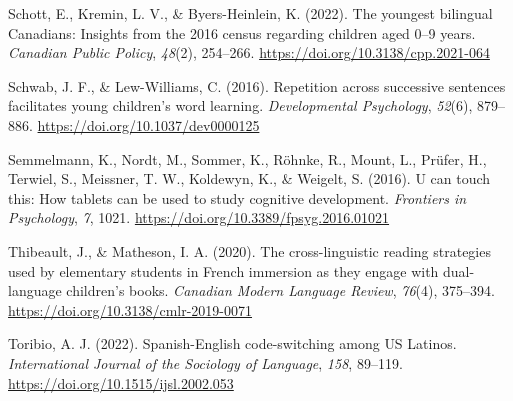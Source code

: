 \documentclass[
  man,floatsintext]{apa7}
\newlength{\cslhangindent}
\newlength{\cslentryspacingunit} %
\newenvironment{CSLReferences}[2] %
 {%
  \setlength{\parindent}{0pt}
  \ifodd #1
  \let\oldpar\par
  \def\par{\hangindent=\cslhangindent\oldpar}
  \fi
  \setlength{\parskip}{#2\cslentryspacingunit}
 }%
 {}
\begin{document}
\begin{CSLReferences}{1}{0}
\leavevmode{}%
Schott, E., Kremin, L. V., \& Byers-Heinlein, K. (2022). The youngest bilingual {Canadians}: Insights from the 2016 census regarding children aged 0--9 years. \emph{Canadian Public Policy}, \emph{48}(2), 254--266. \url{https://doi.org/10.3138/cpp.2021-064}

\leavevmode{}%
Schwab, J. F., \& Lew-Williams, C. (2016). Repetition across successive sentences facilitates young children's word learning. \emph{Developmental Psychology}, \emph{52}(6), 879--886. \url{https://doi.org/10.1037/dev0000125}

\leavevmode{}%
Semmelmann, K., Nordt, M., Sommer, K., Röhnke, R., Mount, L., Prüfer, H., Terwiel, S., Meissner, T. W., Koldewyn, K., \& Weigelt, S. (2016). U can touch this: How tablets can be used to study cognitive development. \emph{Frontiers in Psychology}, \emph{7}, 1021. \url{https://doi.org/10.3389/fpsyg.2016.01021}

\leavevmode{}%
Thibeault, J., \& Matheson, I. A. (2020). The cross-linguistic reading strategies used by elementary students in {French} immersion as they engage with dual-language children's books. \emph{Canadian Modern Language Review}, \emph{76}(4), 375--394. \url{https://doi.org/10.3138/cmlr-2019-0071}

\leavevmode{}%
Toribio, A. J. (2022). {Spanish-English} code-switching among {US Latinos}. \emph{International Journal of the Sociology of Language}, \emph{158}, 89--119. \url{https://doi.org/10.1515/ijsl.2002.053}

\end{CSLReferences}

\endgroup
\end{document}
